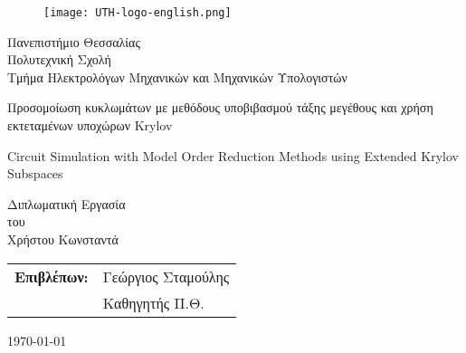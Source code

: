 \begin{titlepage}

\begin{figure}[H]
  \begin{center}
    \texttt{[image: UTH-logo-english.png]}
    \label{fig:cover_auth_logo}
  \end{center}
\end{figure}

\centering
\Large Πανεπιστήμιο Θεσσαλίας\\
\Large Πολυτεχνική Σχολή\\
\large Τμήμα Ηλεκτρολόγων Μηχανικών και Μηχανικών Υπολογιστών\\

\vspace{\fill}

\LARGE Προσομοίωση κυκλωμάτων με μεθόδους 
υποβιβασμού τάξης μεγέθους και χρήση εκτεταμένων υποχώρων 
Krylov

\vspace{\fill}

\LARGE Circuit Simulation with Model Order Reduction Methods using Extended 
Krylov Subspaces

\vspace{\fill}

\Large Διπλωματική Εργασία\\
\Large του\\
\Large Χρήστου Κωνσταντά

\vspace{\fill}
\raggedright

\begin{tabular}{ll}
\textbf{Επιβλέπων:} & Γεώργιος Σταμούλης\\
 & Καθηγητής Π.Θ.\\
\end{tabular}

\centering
\vspace{\fill}
\today

\end{titlepage}

